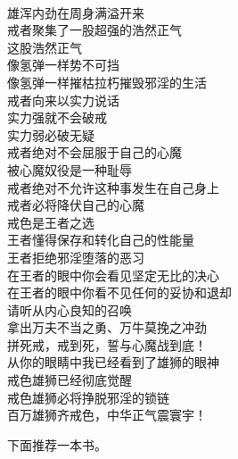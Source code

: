 \begin{poem}[戒出雄狮气场]
    \begin{multicols}{2}
        \centering~\\
        雄浑内劲在周身满溢开来 \\ 戒者聚集了一股超强的浩然正气 \\ 这股浩然正气 \\ 像氢弹一样势不可挡 \\ 像氢弹一样摧枯拉朽摧毁邪淫的生活 \\ 戒者向来以实力说话 \\ 实力强就不会破戒 \\ 实力弱必破无疑 \\ 戒者绝对不会屈服于自己的心魔 \\ 被心魔奴役是一种耻辱 \\ 戒者绝对不允许这种事发生在自己身上 \\ 戒者必将降伏自己的心魔 \\ 戒色是王者之选 \\ 王者懂得保存和转化自己的性能量 \\ 王者拒绝邪淫堕落的恶习 \\ 在王者的眼中你会看见坚定无比的决心 \\ 在王者的眼中你看不见任何的妥协和退却 \\ 请听从内心良知的召唤 \\ 拿出万夫不当之勇、万牛莫挽之冲劲 \\ 拼死戒，戒到死，誓与心魔战到底！ \\ 从你的眼睛中我已经看到了雄狮的眼神 \\ 戒色雄狮已经彻底觉醒 \\ 戒色雄狮必将挣脱邪淫的锁链 \\ 百万雄狮齐戒色，中华正气震寰宇！
    \end{multicols}
\end{poem}

下面推荐一本书。

